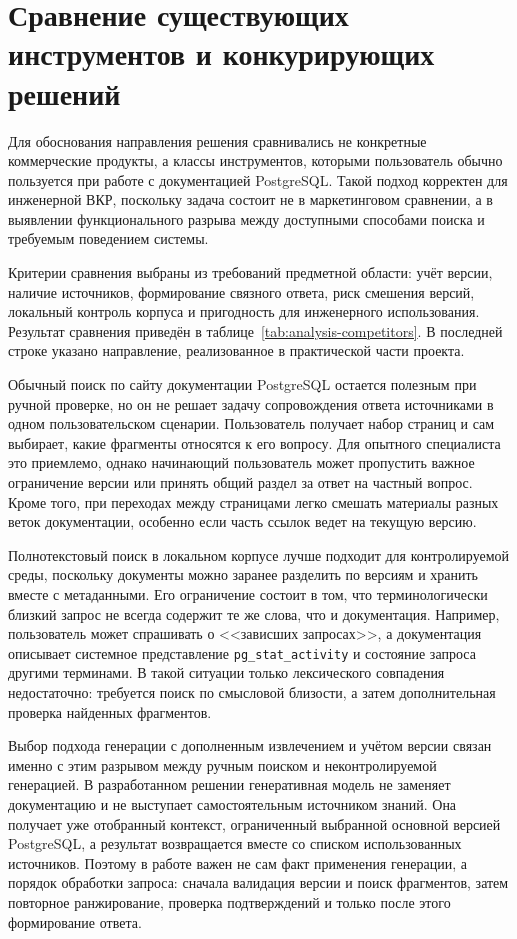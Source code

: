 \section{Сравнение существующих инструментов и конкурирующих решений}

Для обоснования направления решения сравнивались не конкретные коммерческие продукты, а классы инструментов, которыми пользователь обычно пользуется при работе с документацией PostgreSQL. Такой подход корректен для инженерной ВКР, поскольку задача состоит не в маркетинговом сравнении, а в выявлении функционального разрыва между доступными способами поиска и требуемым поведением системы.

Критерии сравнения выбраны из требований предметной области: учёт версии, наличие источников, формирование связного ответа, риск смешения версий, локальный контроль корпуса и пригодность для инженерного использования. Результат сравнения приведён в таблице~\ref{tab:analysis-competitors}. В последней строке указано направление, реализованное в практической части проекта.

Обычный поиск по сайту документации PostgreSQL остается полезным при ручной проверке, но он не решает задачу сопровождения ответа источниками в одном пользовательском сценарии. Пользователь получает набор страниц и сам выбирает, какие фрагменты относятся к его вопросу. Для опытного специалиста это приемлемо, однако начинающий пользователь может пропустить важное ограничение версии или принять общий раздел за ответ на частный вопрос. Кроме того, при переходах между страницами легко смешать материалы разных веток документации, особенно если часть ссылок ведет на текущую версию.

Полнотекстовый поиск в локальном корпусе лучше подходит для контролируемой среды, поскольку документы можно заранее разделить по версиям и хранить вместе с метаданными. Его ограничение состоит в том, что терминологически близкий запрос не всегда содержит те же слова, что и документация. Например, пользователь может спрашивать о <<зависших запросах>>, а документация описывает системное представление \texttt{pg\_stat\_activity} и состояние запроса другими терминами. В такой ситуации только лексического совпадения недостаточно: требуется поиск по смысловой близости, а затем дополнительная проверка найденных фрагментов.

Выбор подхода генерации с дополненным извлечением и учётом версии связан именно с этим разрывом между ручным поиском и неконтролируемой генерацией. В разработанном решении генеративная модель не заменяет документацию и не выступает самостоятельным источником знаний. Она получает уже отобранный контекст, ограниченный выбранной основной версией PostgreSQL, а результат возвращается вместе со списком использованных источников. Поэтому в работе важен не сам факт применения генерации, а порядок обработки запроса: сначала валидация версии и поиск фрагментов, затем повторное ранжирование, проверка подтверждений и только после этого формирование ответа.


